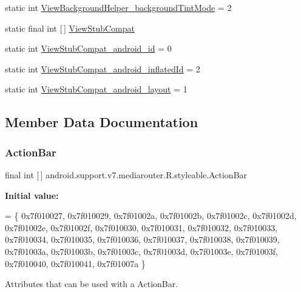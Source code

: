 \begin{DoxyCompactItemize}
\item 
static int \hyperlink{classandroid_1_1support_1_1v7_1_1mediarouter_1_1R_1_1styleable_a61f31935344280c75bfeb7fe5e2b0794}{View\+Background\+Helper\+\_\+background\+Tint\+Mode} = 2
\item 
static final int \mbox{[}$\,$\mbox{]} \hyperlink{classandroid_1_1support_1_1v7_1_1mediarouter_1_1R_1_1styleable_a2fcde22ac0505d305fd8836a3252d763}{View\+Stub\+Compat}
\item 
static int \hyperlink{classandroid_1_1support_1_1v7_1_1mediarouter_1_1R_1_1styleable_a3719fa2d9310287811d6fec60694b692}{View\+Stub\+Compat\+\_\+android\+\_\+id} = 0
\item 
static int \hyperlink{classandroid_1_1support_1_1v7_1_1mediarouter_1_1R_1_1styleable_a1dfd76827a9d1ef07e8512ba9ebf5ad0}{View\+Stub\+Compat\+\_\+android\+\_\+inflated\+Id} = 2
\item 
static int \hyperlink{classandroid_1_1support_1_1v7_1_1mediarouter_1_1R_1_1styleable_aa773bc500a7a8b41812f2da8e40497f6}{View\+Stub\+Compat\+\_\+android\+\_\+layout} = 1
\end{DoxyCompactItemize}


\subsection{Member Data Documentation}
\mbox{\label{classandroid_1_1support_1_1v7_1_1mediarouter_1_1R_1_1styleable_adc4d3c0d096085367f12d025007aa53f}} 
\subsubsection{\texorpdfstring{Action\+Bar}{ActionBar}}
{\footnotesize\ttfamily final int \mbox{[}$\,$\mbox{]} android.\+support.\+v7.\+mediarouter.\+R.\+styleable.\+Action\+Bar\hspace{0.3cm}{\ttfamily [static]}}

{\bfseries Initial value\+:}
\begin{DoxyCode}
= \{
            0x7f010027, 0x7f010029, 0x7f01002a, 0x7f01002b,
            0x7f01002c, 0x7f01002d, 0x7f01002e, 0x7f01002f,
            0x7f010030, 0x7f010031, 0x7f010032, 0x7f010033,
            0x7f010034, 0x7f010035, 0x7f010036, 0x7f010037,
            0x7f010038, 0x7f010039, 0x7f01003a, 0x7f01003b,
            0x7f01003c, 0x7f01003d, 0x7f01003e, 0x7f01003f,
            0x7f010040, 0x7f010041, 0x7f01007a
        \}
\end{DoxyCode}
Attributes that can be used with a Action\+Bar. 

